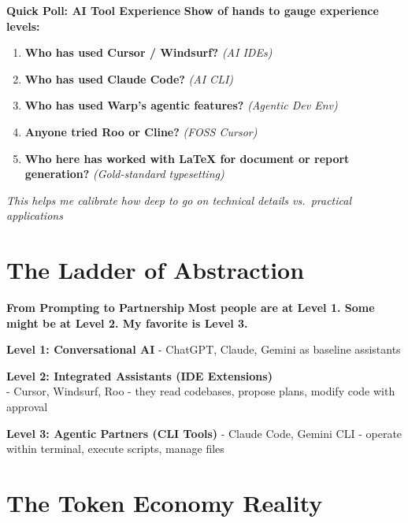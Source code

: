 \documentclass[
  ignorenonframetext,
  aspectratio=169,
]{beamer}
\begin{document}
\begin{frame}{\textbf{Quick Poll: AI Tool Experience}}
\textbf{Show of hands to gauge experience levels:}

\begin{enumerate}
\item
  \textbf{Who has used Cursor / Windsurf?} \emph{(AI IDEs)}
\item
  \textbf{Who has used Claude Code?} \emph{(AI CLI)}
\item
  \textbf{Who has used Warp's agentic features?} \emph{(Agentic Dev
  Env)}
\item
  \textbf{Anyone tried Roo or Cline?} \emph{(FOSS Cursor)}
\item
  \textbf{Who here has worked with LaTeX for document or report
  generation?} \emph{(Gold-standard typesetting)}
\end{enumerate}

\emph{This helps me calibrate how deep to go on technical details
vs.~practical applications}
\end{frame}

\begin{frame}
\end{frame}

\section{\texorpdfstring{\textbf{The Ladder of
Abstraction}}{The Ladder of Abstraction}}\label{the-ladder-of-abstraction}

\begin{frame}{\textbf{From Prompting to Partnership}}
\label{from-prompting-to-partnership}
\textbf{Most people are at Level 1. Some might be at Level 2. My
favorite is Level 3.}

\textbf{Level 1: Conversational AI} - ChatGPT, Claude, Gemini as
baseline assistants

\textbf{Level 2: Integrated Assistants (IDE Extensions)}\\
- Cursor, Windsurf, Roo - they read codebases, propose plans, modify
code with approval

\textbf{Level 3: Agentic Partners (CLI Tools)} - Claude Code, Gemini CLI
- operate within terminal, execute scripts, manage files
\end{frame}

\begin{frame}
\end{frame}

\section{\texorpdfstring{\textbf{The Token Economy
Reality}}{The Token Economy Reality}}\label{the-token-economy-reality}
\end{document}
